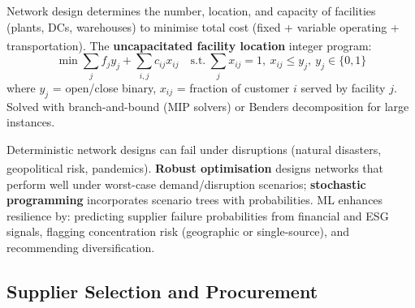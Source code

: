\begin{tcbitemize}[ skin=sectionraster ]

    \tcbitem[title=Facility Location Problem, raster multicolumn=3]
    Network design determines the number, location, and capacity of facilities (plants, DCs, warehouses) to minimise total cost (fixed + variable operating + transportation)\textsuperscript{\cite[][pp.~146--160]{chopraSupplyChainManagement2019}}.
    The \textbf{uncapacitated facility location} integer program:
    \begin{equation}
        \min \sum_j f_j y_j + \sum_{i,j} c_{ij} x_{ij}
        \quad \text{s.t.}\ \sum_j x_{ij}=1,\ x_{ij}\le y_j,\ y_j\in\{0,1\}
    \end{equation}
    where $y_j$ = open/close binary, $x_{ij}$ = fraction of customer $i$ served by facility $j$.
    Solved with branch-and-bound (MIP solvers) or Benders decomposition for large instances.

    \tcbitem[title=Scenario Planning and Resilience, raster multicolumn=3]
    Deterministic network designs can fail under disruptions (natural disasters, geopolitical risk, pandemics)\textsuperscript{\cite[][pp.~600--605]{chopraSupplyChainManagement2019}}.
    \textbf{Robust optimisation} designs networks that perform well under worst-case demand/disruption scenarios; \textbf{stochastic programming} incorporates scenario trees with probabilities.
    ML enhances resilience by: predicting supplier failure probabilities from financial and ESG signals, flagging concentration risk (geographic or single-source), and recommending diversification.

\end{tcbitemize}

\subsection{Supplier Selection and Procurement}

